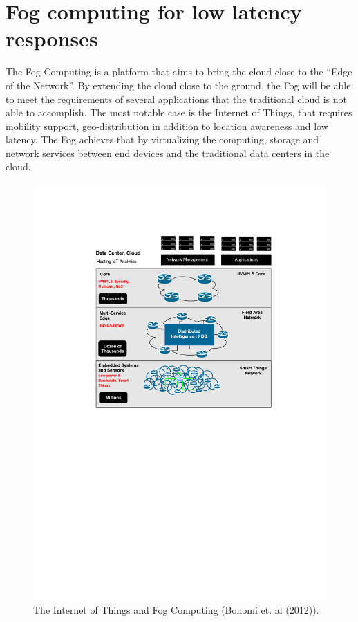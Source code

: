 \section{Fog computing for low latency responses}
\label{sec:fog_computing}
The Fog Computing \cite{bonomi2012fog} is a platform that aims to bring the cloud close to the ``Edge
of the Network''. By extending the cloud close to the ground, the Fog will be able to meet the requirements
of several applications that the traditional cloud is not able to accomplish. The most notable case
is the Internet of Things, that requires mobility support, geo-distribution in addition to location
awareness and low latency. The Fog achieves that by virtualizing the computing, storage and network
services between end devices and the traditional data centers in the cloud.\\

\begin{figure}[ht!]
  \centering
  \includegraphics[width=.9\textwidth]{./images/fog_architecture}
  \caption[IoT and Fog Computing.]{The Internet of Things and Fog Computing (Bonomi et. al (2012)).}
  \label{fig:fog_architecture}
\end{figure}

